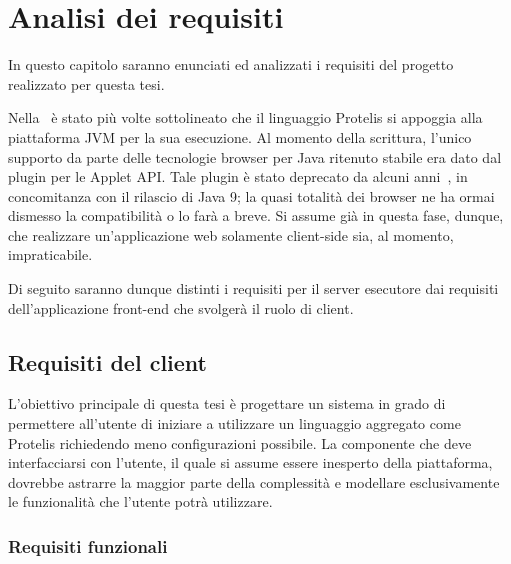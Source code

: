 \chapter{Analisi dei requisiti}\label{ch:requirements}
  In questo capitolo saranno enunciati ed analizzati i requisiti del progetto realizzato per questa tesi.

  Nella~ è stato più volte sottolineato che il linguaggio Protelis si appoggia alla piattaforma JVM per la sua esecuzione.
  Al momento della scrittura, l'unico supporto da parte delle tecnologie browser per Java ritenuto stabile era dato dal plugin per le Applet API\@.
  Tale plugin è stato deprecato da alcuni anni~\cite{jep289}, in concomitanza con il rilascio di Java 9;
  la quasi totalità dei browser ne ha ormai dismesso la compatibilità o lo farà a breve.
  Si assume già in questa fase, dunque, che realizzare un'applicazione web solamente client-side sia, al momento, impraticabile.

  Di seguito saranno dunque distinti i requisiti per il server esecutore dai requisiti dell'applicazione front-end che svolgerà il ruolo di client.

  \section{Requisiti del client}
    L'obiettivo principale di questa tesi è progettare un sistema in grado di permettere all'utente di iniziare a utilizzare un linguaggio aggregato come Protelis richiedendo meno configurazioni possibile.
    La componente che deve interfacciarsi con l'utente, il quale si assume essere inesperto della piattaforma, dovrebbe astrarre la maggior parte della complessità e modellare esclusivamente le funzionalità che l'utente potrà utilizzare.

    \subsection{Requisiti funzionali}

